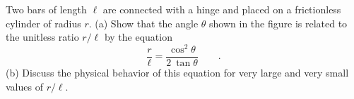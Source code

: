Two bars of length $\ell$ are connected with a hinge and
placed on a frictionless cylinder of radius $r$. (a) Show that
the angle $\theta$ shown in the figure is related to the unitless
ratio $r/\ell$ by the equation 
\begin{equation*}
         \frac{r}{\ell} = \frac{\cos^2\theta}{2\:\tan\theta} \qquad .
\end{equation*}\hwendpart
(b) Discuss the physical behavior of this equation for very
large and very small values of $r/\ell$.
